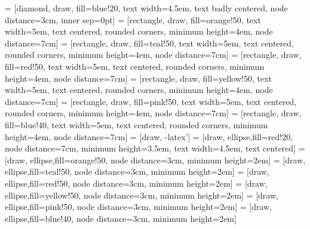 \documentclass{article}
\begin{document}
\pagestyle{empty}


 = [diamond, draw, fill=blue!20, 
    text width=4.5em, text badly centered, node distance=3cm, inner sep=0pt]
 = [rectangle, draw, fill=orange!50, 
    text width=5em, text centered, rounded corners, minimum height=4em, node distance=7cm]
     = [rectangle, draw, fill=teal!50, 
    text width=5em, text centered, rounded corners, minimum height=4em, node distance=7cm]
     = [rectangle, draw, fill=red!50, 
    text width=5em, text centered, rounded corners, minimum height=4em, node distance=7cm]
     = [rectangle, draw, fill=yellow!50, 
    text width=5em, text centered, rounded corners, minimum height=4em, node distance=7cm]
     = [rectangle, draw, fill=pink!50, 
    text width=5em, text centered, rounded corners, minimum height=4em, node distance=7cm]
     = [rectangle, draw, fill=blue!40, 
    text width=5em, text centered, rounded corners, minimum height=4em, node distance=7cm]
 = [draw, -latex']
 = [draw, ellipse,fill=red!20, node distance=7cm,
    minimum height=3.5em, text width=4.5em, text centered]
    = [draw, ellipse,fill=orange!50, node distance=3cm,
    minimum height=2em]
        = [draw, ellipse,fill=teal!50, node distance=3cm,
    minimum height=2em]
        = [draw, ellipse,fill=red!50, node distance=3cm,
    minimum height=2em]
        = [draw, ellipse,fill=yellow!50, node distance=3cm,
    minimum height=2em]
        = [draw, ellipse,fill=pink!50, node distance=3cm,
    minimum height=2em]
        = [draw, ellipse,fill=blue!40, node distance=3cm,
    minimum height=2em]
    
\end{document}
